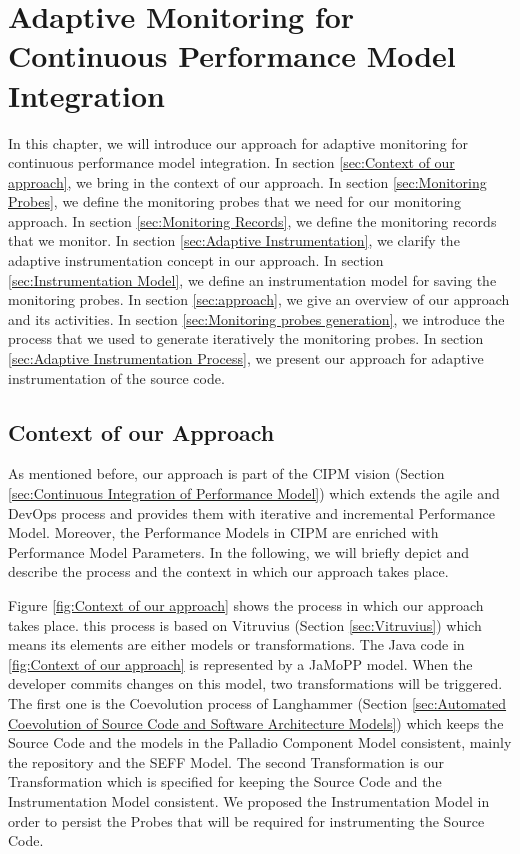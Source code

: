 

\chapter{Adaptive Monitoring for Continuous Performance Model Integration}
\label{ch:Adaptive Monitoring for Continuous Performance Model Integration}
In this chapter, we will introduce our approach for adaptive monitoring for continuous performance model integration. In section \ref{sec:Context of our approach}, we bring in the context of our approach. In section \ref{sec:Monitoring Probes}, we define the monitoring probes that we need for our monitoring approach. In section \ref{sec:Monitoring Records}, we define the monitoring records that we monitor. In section \ref{sec:Adaptive Instrumentation}, we clarify the adaptive instrumentation concept in our approach. In section \ref{sec:Instrumentation Model}, we define an instrumentation model for saving the monitoring probes. In section \ref{sec:approach}, we give an overview of our approach and its activities. In section \ref{sec:Monitoring probes generation}, we introduce the process that we used to generate iteratively the monitoring probes. In section \ref{sec:Adaptive Instrumentation Process}, we present our approach for adaptive instrumentation of the source code. 

\section{Context of our Approach}
\label{sec:Context of our Approach}
As mentioned before, our approach is part of the CIPM vision (Section \ref{sec:Continuous Integration of Performance Model}) which extends the agile and DevOps process and provides them with iterative and incremental Performance Model. Moreover, the Performance Models in CIPM are enriched with Performance Model Parameters. In the following, we will briefly depict and describe the process and the context in which our approach takes place.

Figure \ref{fig:Context of our approach} shows the process in which our approach takes place. this process is based on Vitruvius (Section \ref{sec:Vitruvius}) which means its elements are either models or transformations. The Java code in \ref{fig:Context of our approach} is represented by a JaMoPP model. When the developer commits changes on this model, two transformations will be triggered. The first one is the Coevolution process of Langhammer (Section \ref{sec:Automated Coevolution of Source Code and Software Architecture Models}) which keeps the Source Code and the models in the Palladio Component Model consistent, mainly the repository and the SEFF Model. The second Transformation is our Transformation which is specified for keeping the Source Code and the Instrumentation Model consistent. We proposed the Instrumentation Model in order to persist the Probes that will be required for instrumenting the Source Code.

